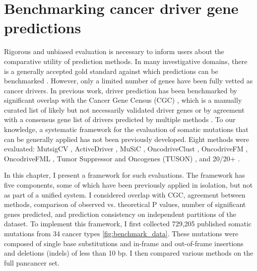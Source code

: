 
\chapter{Benchmarking cancer driver gene predictions}
\label{chap:ch4}

Rigorous and unbiased evaluation is necessary to inform users about the comparative utility of prediction methods. In many investigative domains, there is a generally accepted gold standard against which predictions can be benchmarked \cite{RN102, RN103}. However, only a limited number of genes have been fully vetted as cancer drivers. In previous work, driver prediction has been benchmarked by significant overlap with the Cancer Gene Census (CGC) \cite{RN97}, which is a manually curated list of likely but not necessarily validated driver genes \cite{RN54, RN53} or by agreement with a consensus gene list of drivers predicted by multiple methods \cite{RN96}. To our knowledge, a systematic framework for the evaluation of somatic mutations that can be generally applied has not been previously developed. Eight methods were evaluated: MutsigCV \cite{RN13}, ActiveDriver \cite{RN98}, MuSiC \cite{RN43}, OncodriveClust \cite{RN54}, OncodriveFM \cite{RN53}, OncodriveFML \cite{RN86}, Tumor Suppressor and Oncogenes (TUSON) \cite{RN71}, and 20/20+ \cite{RN70}. 

In this chapter, I present a framework for such evaluations. The framework has five components, some of which have been previously applied in isolation, but not as part of a unified system. I considered overlap with CGC, agreement between methods, comparison of observed vs. theoretical P values, number of significant genes predicted, and prediction consistency on independent partitions of the dataset. To implement this framework, I first collected 729,205 published somatic mutations from 34 cancer types \cite{RN14, RN71} \autoref{fig:benchmark_data}. These mutations were composed of single base substitutions and in-frame and out-of-frame insertions and deletions (indels) of less than 10 bp. I then compared various methods on the full pancancer set.


